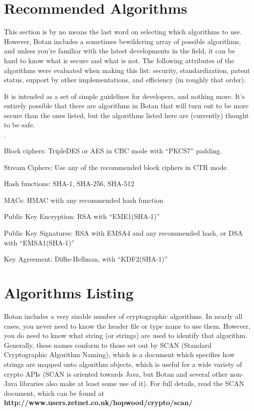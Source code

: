 \documentclass{article}
\begin{document}
\pagebreak

\section{Recommended Algorithms}

This section is by no means the last word on selecting which algorithms to use.
However, Botan includes a sometimes bewildering array of possible algorithms,
and unless you're familiar with the latest developments in the field, it can be
hard to know what is secure and what is not. The following attributes of the
algorithms were evaluated when making this list: security, standardization,
patent status, support by other implementations, and efficiency (in roughly
that order).

It is intended as a set of simple guidelines for developers, and nothing more.
It's entirely possible that there are algorithms in Botan that will turn out to
be more secure than the ones listed, but the algorithms listed here are
(currently) thought to be safe.

\begin{list}{$\cdot$}
  \item Block ciphers: TripleDES or AES in CBC mode with ``PKCS7'' padding.
  \item

  \item Stream Ciphers: Use any of the recommended block ciphers in CTR mode.

  \item Hash functions: SHA-1, SHA-256, SHA-512

  \item MACs: HMAC with any recommended hash function

  \item Public Key Encryption: RSA with ``EME1(SHA-1)''

  \item Public Key Signatures: RSA with EMSA4 and any recommended hash, or DSA
     with ``EMSA1(SHA-1)''

  \item Key Agreement: Diffie-Hellman, with ``KDF2(SHA-1)''
\end{list}

\pagebreak

\section{Algorithms Listing}

Botan includes a very sizable number of cryptographic algorithms. In nearly all
cases, you never need to know the header file or type name to use
them. However, you do need to know what string (or strings) are used to
identify that algorithm. Generally, these names conform to those set out by
SCAN (Standard Cryptographic Algorithm Naming), which is a document which
specifies how strings are mapped onto algorithm objects, which is useful for a
wide variety of crypto APIs (SCAN is oriented towards Java, but Botan and
several other non-Java libraries also make at least some use of it). For full
details, read the SCAN document, which can be found at
\textbf{http://www.users.zetnet.co.uk/hopwood/crypto/scan/}
\end{document}
